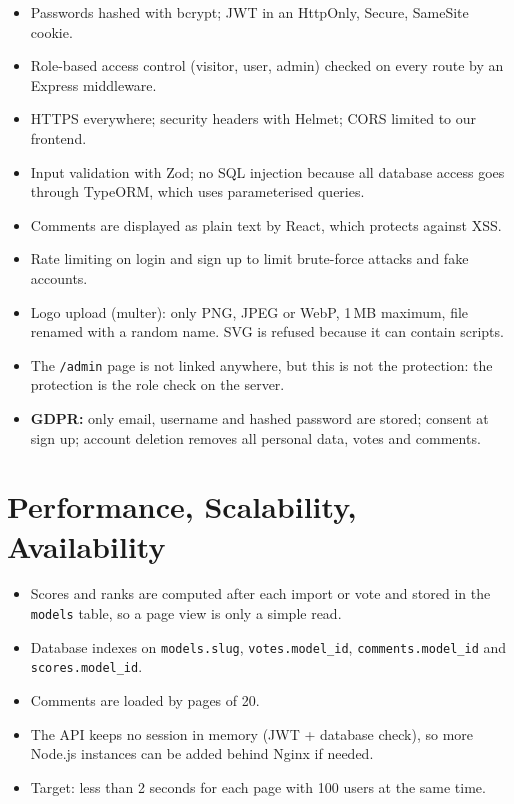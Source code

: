 \documentclass[11pt,a4paper]{article}
\begin{document}
\begin{itemize}
  \item Passwords hashed with bcrypt; JWT in an HttpOnly, Secure, SameSite cookie.
  \item Role-based access control (visitor, user, admin) checked on every route by an Express middleware.
  \item HTTPS everywhere; security headers with Helmet; CORS limited to our frontend.
  \item Input validation with Zod; no SQL injection because all database access goes through TypeORM, which uses parameterised queries.
  \item Comments are displayed as plain text by React, which protects against XSS.
  \item Rate limiting on login and sign up to limit brute-force attacks and fake accounts.
  \item Logo upload (multer): only PNG, JPEG or WebP, 1\,MB maximum, file renamed with a random name. SVG is refused because it can contain scripts.
  \item The \texttt{/admin} page is not linked anywhere, but this is not the protection: the protection is the role check on the server.
  \item \textbf{GDPR:} only email, username and hashed password are stored; consent at sign up; account deletion removes all personal data, votes and comments.
\end{itemize}

\section{Performance, Scalability, Availability}

\begin{itemize}
  \item Scores and ranks are computed after each import or vote and stored in the \texttt{models} table, so a page view is only a simple read.
  \item Database indexes on \texttt{models.slug}, \texttt{votes.model\_id}, \texttt{comments.model\_id} and \texttt{scores.model\_id}.
  \item Comments are loaded by pages of 20.
  \item The API keeps no session in memory (JWT + database check), so more Node.js instances can be added behind Nginx if needed.
  \item Target: less than 2 seconds for each page with 100 users at the same time.
\end{itemize}
\end{document}
